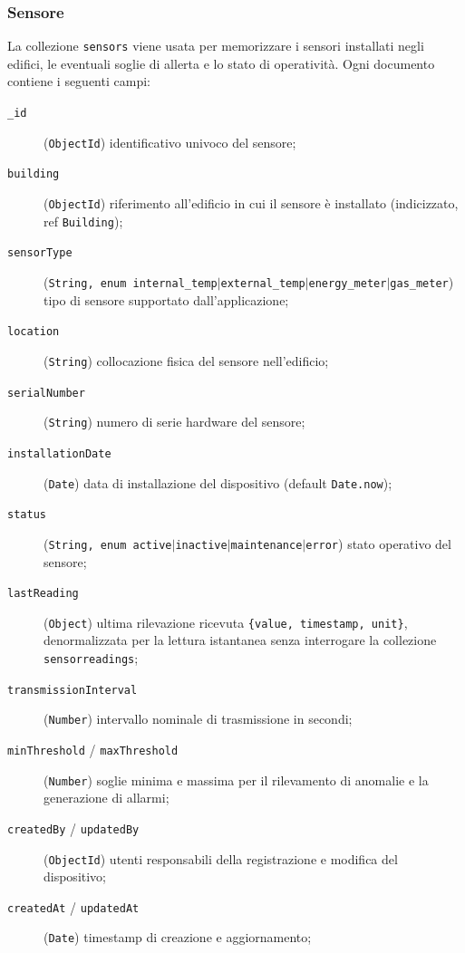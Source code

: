     \subsubsection{Sensore}
        La collezione \texttt{sensors} viene usata per memorizzare i sensori
        installati negli edifici, le eventuali soglie di allerta e lo stato di operatività. Ogni documento contiene i seguenti campi:
        \begin{description}
            \item[\texttt{\_id}] (\texttt{ObjectId}) identificativo univoco del sensore;
            \item[\texttt{building}] (\texttt{ObjectId}) riferimento all'edificio in cui il sensore è installato (indicizzato, ref \texttt{Building});
            \item[\texttt{sensorType}] (\texttt{String, enum \texttt{internal\_temp}$|$\texttt{external\_temp}$|$\texttt{energy\_meter}$|$\texttt{gas\_meter}}) tipo di sensore supportato dall'applicazione;
            \item[\texttt{location}] (\texttt{String}) collocazione fisica del sensore nell'edificio;
            \item[\texttt{serialNumber}] (\texttt{String}) numero di serie hardware del sensore;
            \item[\texttt{installationDate}] (\texttt{Date}) data di installazione del dispositivo (default \texttt{Date.now});
            \item[\texttt{status}] (\texttt{String, enum \texttt{active}$|$\texttt{inactive}$|$\texttt{maintenance}$|$\texttt{error}}) stato operativo del sensore;
            \item[\texttt{lastReading}] (\texttt{Object}) ultima rilevazione ricevuta \texttt{\{value, timestamp, unit\}}, denormalizzata per la lettura istantanea senza interrogare la collezione \texttt{sensorreadings};
            \item[\texttt{transmissionInterval}] (\texttt{Number}) intervallo nominale di trasmissione in secondi;
            \item[\texttt{minThreshold} / \texttt{maxThreshold}] (\texttt{Number}) soglie minima e massima per il rilevamento di anomalie e la generazione di allarmi;
            \item[\texttt{createdBy} / \texttt{updatedBy}] (\texttt{ObjectId}) utenti responsabili della registrazione e modifica del dispositivo;
            \item[\texttt{createdAt} / \texttt{updatedAt}] (\texttt{Date}) timestamp di creazione e aggiornamento;
        \end{description}
